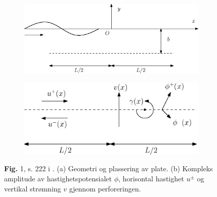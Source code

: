 \documentclass[a4paper,norsk]{article}
\begin{document}
\begin{figure}
\centering
\begin{subfigure}{.5\textwidth}
  \centering
  \includegraphics[width=0.95\linewidth]{horisontal_plate.eps}
  \caption{}
  \label{fig::faltinsen1}
\end{subfigure}%
\begin{subfigure}{.5\textwidth}
  \centering
  \includegraphics[width=0.95\linewidth]{horisontal_plate_closeup.eps}
  \caption{}
  \label{fig::faltinsen2}
\end{subfigure}
\caption{\textbf{Fig.} 1, s. 222 i \cite{faltinsen}. (a) Geometri og plassering av plate. (b) Kompleks amplitude av hastighetspotensialet $\phi$, horisontal hastighet $u^\pm$ og vertikal strømning $v$ gjennom perforeringen.}
\label{fig::faltinsen}
\end{figure}


\end{document}
